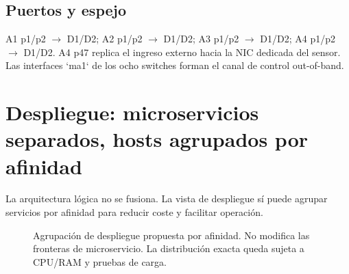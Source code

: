 \documentclass[11pt,a4paper]{article}
\begin{document}
\subsection{Puertos y espejo}

A1 p1/p2 \(\rightarrow\) D1/D2; A2 p1/p2 \(\rightarrow\) D1/D2; A3 p1/p2 \(\rightarrow\) D1/D2; A4 p1/p2 \(\rightarrow\) D1/D2. A4 p47 replica el ingreso externo hacia la NIC dedicada del sensor. Las interfaces `ma1` de los ocho switches forman el canal de control out-of-band.

\section{Despliegue: microservicios separados, hosts agrupados por afinidad}

La arquitectura lógica no se fusiona. La vista de despliegue sí puede agrupar servicios por afinidad para reducir coste y facilitar operación.

\begin{figure}[H]
\centering
{}
\caption{Agrupación de despliegue propuesta por afinidad. No modifica las fronteras de microservicio. La distribución exacta queda sujeta a CPU/RAM y pruebas de carga.}
\end{figure}
\end{document}
